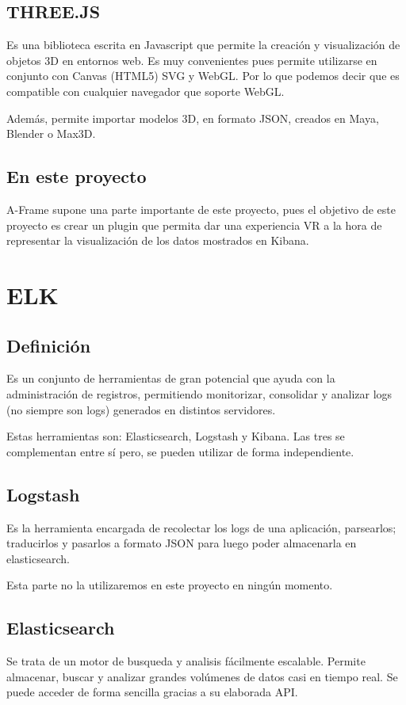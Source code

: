 \documentclass[a4paper, 12pt]{book}
\begin{document}
\subsection{THREE.JS}
Es una biblioteca escrita en Javascript que permite la creaci\'on y visualizaci\'on de objetos 3D en entornos web. Es muy convenientes pues permite utilizarse en conjunto con Canvas (HTML5) SVG y WebGL. Por lo que podemos decir que es compatible con cualquier navegador que soporte WebGL.

Adem\'as, permite importar modelos 3D, en formato JSON,  creados en Maya, Blender o Max3D.

\subsection{En este proyecto}
A-Frame supone una parte importante de este proyecto, pues el objetivo de este proyecto es crear un plugin que permita dar una experiencia VR a la hora de representar la visualizaci\'on de los datos mostrados en Kibana. 



\section{ELK}
\label{sec:elastic}
\subsection{Definici\'on}
Es un conjunto de herramientas de gran potencial que ayuda con la administraci\'on de registros, permitiendo monitorizar, consolidar y analizar logs (no siempre son logs) generados en distintos servidores.
 
Estas herramientas son: Elasticsearch, Logstash y Kibana. Las tres se complementan entre s\'i pero, se pueden utilizar de forma independiente.

\subsection{Logstash}
Es la herramienta encargada de recolectar los logs de una aplicaci\'on, parsearlos; traducirlos y pasarlos a formato JSON para luego poder almacenarla en elasticsearch. 

Esta parte no la utilizaremos en este proyecto en ningún momento.

\subsection{Elasticsearch}
Se trata de un motor de busqueda y analisis fácilmente escalable. Permite almacenar, buscar y analizar grandes vol\'umenes de datos casi en tiempo real. Se puede acceder de forma sencilla gracias a su elaborada API.
\end{document}
